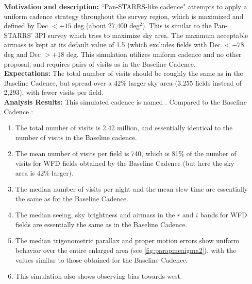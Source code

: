 

{\bf Motivation and description:} ``Pan-STARRS-like cadence" attempts to apply a
uniform cadence strategy throughout the survey region, which is maximized and
defined by Dec $< +15$ deg (about 27,400 deg$^2$). This is similar to the Pan-
STARRS' 3PI survey which tries to maximize sky area. The maximum acceptable
airmass is kept at its default value of 1.5 (which excludes fields with Dec
$<-78$ deg and Dec $> +18$ deg. This simulation utilizes uniform cadence and no
other proposal, and requires pairs of visits as in the Baseline Cadence. \\

{\bf Expectations:} The total number of visits should be roughly the
same as in the Baseline Cadence, but spread over a 42\% larger sky area
(3,255 fields instead of 2,293), with fewer visits per field. \\

{\bf Analysis Results:}  This simulated cadence is named .
Compared to the Baseline Cadence :
\begin{enumerate}
\item The total number of visits is 2.42 million, and essentially identical to the
number of visits in the Baseline cadence.
\item
The mean number of visits per field is 740, which is 81\% of the number of visits %
for WFD fields obtained by the Baseline Cadence (but here the sky area is 42\% larger).
\item The median number of visits per night and the mean slew time are
  essentially the same as for the Baseline Cadence.
\item The median seeing, sky brightness and airmass in the $r$ and $i$
  bands for WFD fields are essentially the same as in the Baseline
  Cadence.
\item The median trigonometric parallax and proper motion errors show
  uniform behavior over the entire enlarged area (see
  \autoref{fig:parapmenigma2}), with the values similar to those
  obtained for the Baseline Cadence.
\item This simulation also shows observing bias towards west.
\end{enumerate}

